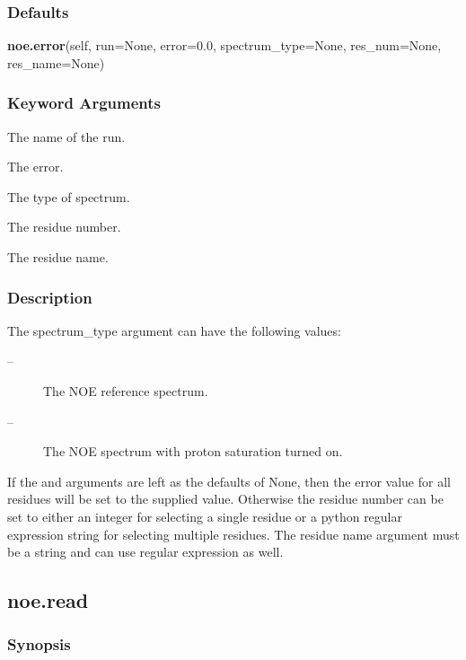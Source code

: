 \subsubsection{Defaults}

\textsf{\textbf{noe.error}(self, run=None, error=0.0, spectrum\_type=None, res\_num=None, res\_name=None)}


\subsubsection{Keyword Arguments}


  The name of the run.

  The error.

  The type of spectrum.

  The residue number.

  The residue name.

\subsubsection{Description}

The spectrum\_type argument can have the following values:
\begin{description}
\item[    
 --]   The NOE reference spectrum.
\item[    
 --]   The NOE spectrum with proton saturation turned on.
\end{description}

If the 
 and 
 arguments are left as the defaults of None, then the error
value for all residues will be set to the supplied value.  Otherwise the residue number can
be set to either an integer for selecting a single residue or a python  regular expression 
string for selecting multiple residues.  The residue name argument must be a string and can
use regular expression  as well.


\newpage

\subsection{noe.read}


\subsubsection{Synopsis}

